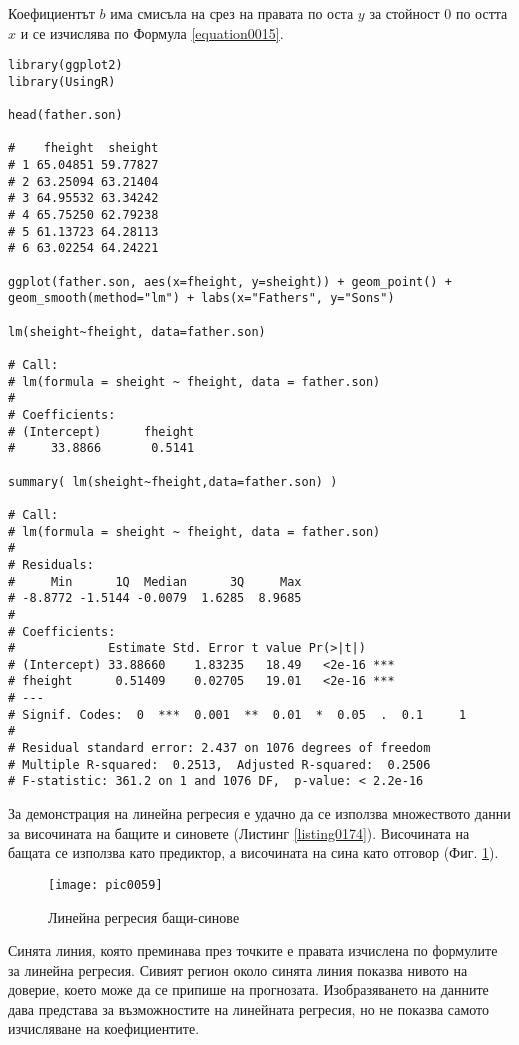 Коефициентът $b$ има смисъла на срез на правата по оста $y$ за стойност 0 по остта $x$ и се изчислява по Формула \ref{equation0015}. 

\begin{lstlisting}[caption=Линейна регресия, label=listing0174]
library(ggplot2)
library(UsingR)

head(father.son)

#    fheight  sheight
# 1 65.04851 59.77827
# 2 63.25094 63.21404
# 3 64.95532 63.34242
# 4 65.75250 62.79238
# 5 61.13723 64.28113
# 6 63.02254 64.24221

ggplot(father.son, aes(x=fheight, y=sheight)) + geom_point() + geom_smooth(method="lm") + labs(x="Fathers", y="Sons")

lm(sheight~fheight, data=father.son)

# Call:
# lm(formula = sheight ~ fheight, data = father.son)
# 
# Coefficients:
# (Intercept)      fheight  
#     33.8866       0.5141  

summary( lm(sheight~fheight,data=father.son) )

# Call:
# lm(formula = sheight ~ fheight, data = father.son)
# 
# Residuals:
#     Min      1Q  Median      3Q     Max 
# -8.8772 -1.5144 -0.0079  1.6285  8.9685 
# 
# Coefficients:
#             Estimate Std. Error t value Pr(>|t|)    
# (Intercept) 33.88660    1.83235   18.49   <2e-16 ***
# fheight      0.51409    0.02705   19.01   <2e-16 ***
# ---
# Signif. Codes:  0  ***  0.001  **  0.01  *  0.05  .  0.1     1
# 
# Residual standard error: 2.437 on 1076 degrees of freedom
# Multiple R-squared:  0.2513,	Adjusted R-squared:  0.2506 
# F-statistic: 361.2 on 1 and 1076 DF,  p-value: < 2.2e-16
\end{lstlisting}

За демонстрация на линейна регресия е удачно да се използва множеството данни за височината на бащите и синовете (Листинг \ref{listing0174}). Височината на бащата се използва като предиктор, а височината на сина като отговор (Фиг. \ref{figure0059}).

\begin{figure}[h!]
  \centering
  \texttt{[image: pic0059]}
  \caption{Линейна регресия бащи-синове}
\label{figure0059}
\end{figure}
\FloatBarrier

Синята линия, която преминава през точките е правата изчислена по формулите за линейна регресия. Сивият регион около синята линия показва нивото на доверие, което може да се припише на прогнозата. Изобразяването на данните дава представа за възможностите на линейната регресия, но не показва самото изчисляване на коефициентите. 

